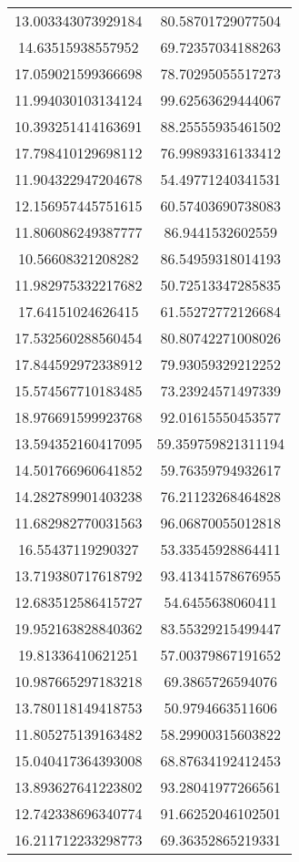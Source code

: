 \begin{table}
\begin{tabular}{cc}
13.003343073929184 & 80.58701729077504 \\
14.63515938557952 & 69.72357034188263 \\
17.059021599366698 & 78.70295055517273 \\
11.994030103134124 & 99.62563629444067 \\
10.393251414163691 & 88.25555935461502 \\
17.798410129698112 & 76.99893316133412 \\
11.904322947204678 & 54.49771240341531 \\
12.156957445751615 & 60.57403690738083 \\
11.806086249387777 & 86.9441532602559 \\
10.56608321208282 & 86.54959318014193 \\
11.982975332217682 & 50.72513347285835 \\
17.64151024626415 & 61.55272772126684 \\
17.532560288560454 & 80.80742271008026 \\
17.844592972338912 & 79.93059329212252 \\
15.574567710183485 & 73.23924571497339 \\
18.976691599923768 & 92.01615550453577 \\
13.594352160417095 & 59.359759821311194 \\
14.501766960641852 & 59.76359794932617 \\
14.282789901403238 & 76.21123268464828 \\
11.682982770031563 & 96.06870055012818 \\
16.55437119290327 & 53.33545928864411 \\
13.719380717618792 & 93.41341578676955 \\
12.683512586415727 & 54.6455638060411 \\
19.952163828840362 & 83.55329215499447 \\
19.81336410621251 & 57.00379867191652 \\
10.987665297183218 & 69.3865726594076 \\
13.780118149418753 & 50.9794663511606 \\
11.805275139163482 & 58.29900315603822 \\
15.040417364393008 & 68.87634192412453 \\
13.893627641223802 & 93.28041977266561 \\
12.742338696340774 & 91.66252046102501 \\
16.211712233298773 & 69.36352865219331 \\

\end{tabular}
\end{table}
